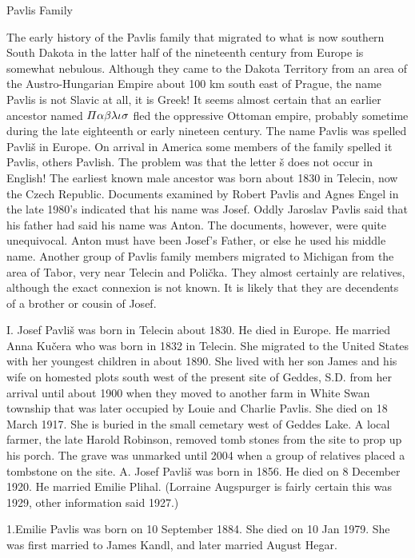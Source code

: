 \documentclass[a4paper]{article}
\begin{document}
\pagebreak

{\Huge \noindent Pavlis Family}
\vskip 5mm

	The early history of the Pavlis family that migrated to what is now southern South Dakota in the latter half of the nineteenth century from Europe is somewhat nebulous.  Although they came to the Dakota Territory from an area of the Austro-Hungarian Empire about 100 km south east of Prague, the name Pavlis is not Slavic at all, it is Greek!   It seems almost certain that an earlier ancestor named $\mathnormal{\Pi\alpha\beta\lambda\iota\sigma}$ fled the oppressive Ottoman empire, probably sometime during the late eighteenth or early nineteen century.  
	The name Pavlis was spelled Pavli\v{s} in Europe.  On arrival in America some members of the family spelled it Pavlis, others Pavlish.  The problem was that the letter \v{s} does not occur in English!    
	The earliest known male ancestor was born about 1830 in Telecin, now the Czech Republic.  Documents examined by Robert Pavlis and Agnes Engel in the late 1980's indicated that his name was Josef.  Oddly Jaroslav Pavlis said that his father had said his name was Anton.  The documents, however,  were quite unequivocal.  Anton must have been Josef's Father, or else he used his middle name.  
	Another group of Pavlis family members migrated to Michigan from the area of Tabor, very near Telecin and Poli\v{c}ka.  They almost certainly are relatives, although the exact connexion is not known.  It is likely that they are decendents of a brother or cousin of Josef. 

I. Josef Pavli\v{s} was born in Telecin about 1830.  He died in Europe.  He married Anna Ku\v{c}era who was born in 1832 in Telecin.  She migrated to the United States with her youngest children in about 1890.  She lived with her son James and his wife on homested plots south west of the present site of Geddes, S.D.  from her arrival until about 1900 when they moved to another farm in White Swan township that was later occupied by Louie and Charlie Pavlis.  She died on 18 March 1917.  She is buried in the small cemetary west of Geddes Lake.  A local farmer, the late Harold Robinson, removed tomb stones from the site to prop up his porch.  The grave was unmarked until 2004 when a group of relatives placed a tombstone on the site.   
\vskip 6mm
A. Josef Pavli\v{s} was born in 1856.  He died on 8 December 1920.  He married Emilie Plihal. (Lorraine Augspurger is fairly certain this was 1929, other information said 1927.)

1.Emilie Pavlis was born on 10 September 1884.  She died on 10 Jan 1979.  She was first married to James Kandl, and later married August Hegar.
\end{document}
